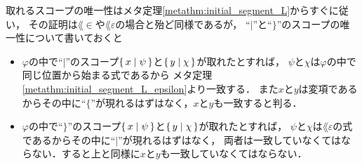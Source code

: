 	取れるスコープの唯一性はメタ定理\ref{metathm:initial_segment_L}からすぐに従い，
	その証明は$\lang{\in}$や$\lang{\varepsilon}$の場合と殆ど同様であるが，
	``$|$''と``$\}$''のスコープの唯一性について書いておくと
	\begin{itemize}
		\item $\varphi$の中で``$|$''のスコープ$\{\, x \mid \psi\, \}$と$\{\, y \mid \chi\, \}$が取れたとすれば，
			$\psi$と$\chi$は$\varphi$の中で同じ位置から始まる式であるから
			メタ定理\ref{metathm:initial_segment_L_epsilon}より一致する．
			また$x$と$y$は変項であるからその中に``$\{$''が現れるはずはなく，$x$と$y$も一致すると判る．
			
		\item $\varphi$の中で``$\}$''のスコープ$\{\, x \mid \psi\, \}$と$\{\, y \mid \chi\, \}$が取れたとすれば，
			$\psi$と$\chi$は$\lang{\varepsilon}$の式であるからその中に``$|$''が現れるはずはなく，
			両者は一致していなくてはならない．すると上と同様に$x$と$y$も一致していなくてはならない．
	\end{itemize}
	
